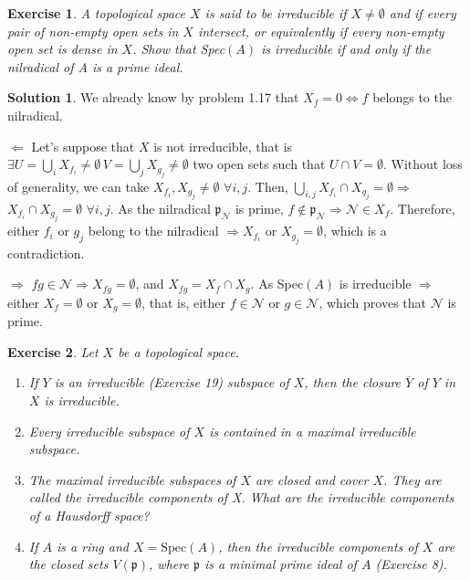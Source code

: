 \documentclass[12pt]{article}
\newcommand{\imp}{\ensuremath{\Rightarrow}}
\newcommand{\ip}{\ensuremath{\mathfrak{p}}}
\newcommand*\closure[1]{\overline{#1}}
\newtheorem{ex}{Exercise}[section]
\theoremstyle{definition}
\newtheorem*{sol}{Solution}
\begin{document}
\begin{ex}
A topological space $X$ is said to be \textit{irreducible} if $X \neq \emptyset$ and if every pair of non-empty open sets in $X$ intersect, or equivalently if every non-empty open set is dense in $X$. Show that Spec$(A)$ is irreducible if and only if the nilradical of A is a prime ideal.
\end{ex}

\begin{sol}
We already know by problem 1.17 that $X_f = 0 \iff f$ belongs to the nilradical. 

\noindent $\boxed{\Leftarrow}$ Let's suppose that $X$ is not irreducible, that is $\exists U = \bigcup_i X_{f_i} \neq \emptyset \, V = \bigcup_j X_{g_j} \neq \emptyset$ two open sets such that $U \cap V = \emptyset$. Without loss of generality, we can take $X_{f_i}, X_{g_j} \neq \emptyset \, \, \forall i,j$. Then, $\bigcup_{i,j} X_{f_i} \cap X_{g_j} = \emptyset \imp$ $X_{f_i} \cap X_{g_j} = \emptyset \, \, \forall i,j$. As the nilradical $\ip_{\mathcal{N}}$ is prime, $f \notin \ip_{\mathcal{N}} \imp \mathcal{N} \in X_f$. Therefore, either $f_i$ or $g_j$ belong to the nilradical $\imp X_{f_i}$ or $X_{g_j} = \emptyset$, which is a contradiction.

\noindent $\boxed{\Rightarrow}$ $fg \in \mathcal{N} \imp X_{fg} = \emptyset$, and $X_{fg} = X_f \cap X_g$. As Spec$(A)$ is irreducible $\imp$ either $X_f = \emptyset$ or $X_g = \emptyset$, that is, either $f \in \mathcal{N}$ or $g \in \mathcal{N}$, which proves that $\mathcal{N}$ is prime.
\end{sol}

\begin{ex}
	Let $X$ be a topological space.
	\begin{enumerate}[]
		\item If $Y$ is an irreducible (Exercise 19) subspace of $X$, then the closure $\closure{Y}$ of $Y$ in $X$ is irreducible.
		\item Every irreducible subspace of $X$ is contained in a maximal irreducible subspace.
		\item The maximal irreducible subspaces of $X$ are closed and cover $X$. They are called the \textit{irreducible components} of X. What are the irreducible components of a Hausdorff space?
		\item If $A$ is a ring and $X = \text{Spec}(A)$, then the irreducible components of $X$ are the closed sets $V(\ip)$, where $\ip$ is a minimal prime ideal of $A$ (Exercise 8).
\end{enumerate}
\end{ex}
\end{document}
